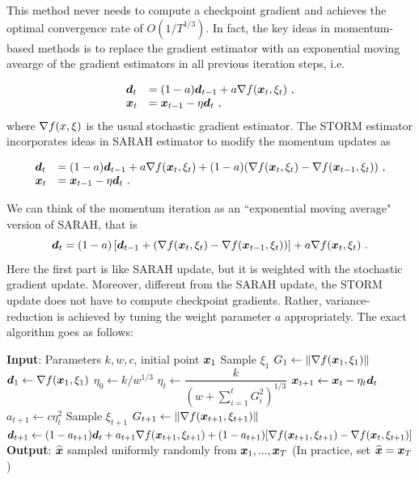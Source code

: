 This method never needs to compute a checkpoint gradient and achieves the optimal convergence rate of $O(1/T^{1/3})$. In fact, the key ideas in momentum-based methods 
is to replace the gradient estimator with an exponential moving avearge of the gradient estimators in all previous iteration steps, i.e.

$$
\begin{array}{ll}
\boldsymbol{d}_{t}&= (1-a)\boldsymbol{d}_{t-1}+a\nabla f(\boldsymbol{x}_t, \xi_{t}) \ ,
\\
\boldsymbol{x}_t & =\boldsymbol{x}_{t-1}-\eta \boldsymbol{d}_t \ ,
\end{array}
$$
where $\nabla f(x, \xi)$ is the usual stochastic gradient estimator. The STORM estimator incorporates ideas in SARAH estimator to modify the momentum updates as

$$
\begin{array}{ll}
\boldd_{t}&= (1-a)\boldd_{t-1}+a\grad f(\boldx_t, \xi_{t})+(1-a)(\grad f(\boldx_t, \xi_t)-\grad f(\boldx_{t-1}, \xi_t)) \ ,
\\
\boldx_t & =\boldx_{t-1}-\eta \boldd_t \ .
\end{array}
$$

We can think of the momentum iteration as an ``exponential moving average" version of SARAH, that is
$$\boldsymbol{d}_{t}= (1-a)\left[\boldsymbol{d}_{t-1}+(\nabla f(\boldsymbol{x}_t, \xi_t)-\nabla f(\boldsymbol{x}_{t-1}, \xi_t))\right]+a\nabla f(\boldsymbol{x}_t, \xi_{t}) \ .
$$
Here the first part is like SARAH update, but it is weighted with the stochastic gradient update. Moreover, different from the SARAH update, the STORM update does not have to compute checkpoint gradients. Rather, variance-reduction is achieved by tuning the weight parameter $a$ appropriately. The exact algorithm goes as follows:

\begin{algorithm}[H]
	\caption{STOchastic Recursive Momentum (STORM)}
	\label{Alg:STORM}
	\begin{algorithmic}[1]
		\STATE \textbf{Input}: Parameters $k, w, c$, initial point $\boldsymbol{x}_1$
		\STATE Sample $\xi_1$
		\STATE $G_1\leftarrow \|\nabla f(\boldsymbol{x}_1,\xi_1)\|$
		\STATE $\boldsymbol{d}_1\leftarrow \nabla f(\boldsymbol{x}_1, \xi_1)$
		\STATE $\eta_0 \leftarrow k/w^{1/3}$
			\STATE $\eta_t \leftarrow \dfrac{k}{(w+\sum_{i=1}^t G_i^2)^{1/3}}$
			\STATE $\boldsymbol{x}_{t+1}\leftarrow \boldsymbol{x}_t-\eta_t \boldsymbol{d}_t$
			\STATE $a_{t+1}\leftarrow c\eta_t^2$
			\STATE Sample $\xi_{t+1}$
			\STATE $G_{t+1}\leftarrow \|\nabla f(\boldsymbol{x}_{t+1}, \xi_{t+1})\|$
			\STATE $\boldsymbol{d}_{t+1}\leftarrow(1-a_{t+1})\boldsymbol{d}_t+a_{t+1} \nabla f(\boldsymbol{x}_{t+1}, \xi_{t+1})+(1-a_{t+1})[\nabla f(\boldsymbol{x}_{t+1}, \xi_{t+1})-\nabla f(\boldsymbol{x}_t, \xi_{t+1})]$
		\ENDFOR
		\STATE \textbf{Output}: $\widehat{\boldsymbol{x}}$ sampled uniformly randomly from $\boldsymbol{x}_1,..., \boldsymbol{x}_T$ (In practice, set $\widehat{\boldsymbol{x}}=\boldsymbol{x}_T$)
	\end{algorithmic}
\end{algorithm}


